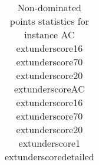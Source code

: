 \begin{table}
\caption{Non-dominated points statistics for instance AC	extunderscore16	extunderscore70	extunderscore20	extunderscoreAC	extunderscore16	extunderscore70	extunderscore20	extunderscore1	extunderscoredetailed}
\label{tab:stats/AC_16_70_20_AC_16_70_20_1_detailed}
\begin{tabular}{}
\toprule
\midrule
\bottomrule
\end{tabular}
\end{table}
